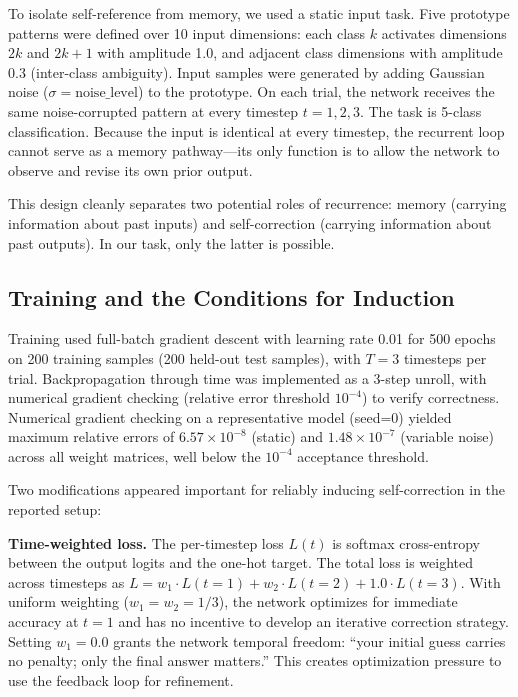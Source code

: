 \documentclass[10pt]{article}
\begin{document}
To isolate self-reference from memory, we used a static input task. Five prototype patterns were defined over 10 input dimensions: each class $k$ activates dimensions $2k$ and $2k{+}1$ with amplitude 1.0, and adjacent class dimensions with amplitude 0.3 (inter-class ambiguity). Input samples were generated by adding Gaussian noise ($\sigma = \text{noise\_level}$) to the prototype. On each trial, the network receives the same noise-corrupted pattern at every timestep $t = 1, 2, 3$. The task is 5-class classification. Because the input is identical at every timestep, the recurrent loop cannot serve as a memory pathway---its only function is to allow the network to observe and revise its own prior output.

This design cleanly separates two potential roles of recurrence: memory (carrying information about past inputs) and self-correction (carrying information about past outputs). In our task, only the latter is possible.

\subsection{Training and the Conditions for Induction}

Training used full-batch gradient descent with learning rate 0.01 for 500 epochs on 200 training samples (200 held-out test samples), with $T = 3$ timesteps per trial. Backpropagation through time was implemented as a 3-step unroll, with numerical gradient checking (relative error threshold $10^{-4}$) to verify correctness. Numerical gradient checking on a representative model (seed=0) yielded maximum relative errors of $6.57 \times 10^{-8}$ (static) and $1.48 \times 10^{-7}$ (variable noise) across all weight matrices, well below the $10^{-4}$ acceptance threshold.

Two modifications appeared important for reliably inducing self-correction in the reported setup:

\textbf{Time-weighted loss.} The per-timestep loss $L(t)$ is softmax cross-entropy between the output logits and the one-hot target. The total loss is weighted across timesteps as $L = w_1 \cdot L(t{=}1) + w_2 \cdot L(t{=}2) + 1.0 \cdot L(t{=}3)$. With uniform weighting ($w_1 = w_2 = 1/3$), the network optimizes for immediate accuracy at $t{=}1$ and has no incentive to develop an iterative correction strategy. Setting $w_1 = 0.0$ grants the network temporal freedom: ``your initial guess carries no penalty; only the final answer matters.'' This creates optimization pressure to use the feedback loop for refinement.
\end{document}
